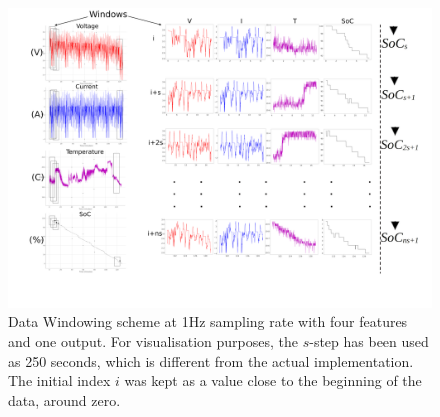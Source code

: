 %
%
\begin{landscape}
    \begin{figure}[ht]
        \centering
        \includegraphics[width=0.9\linewidth]{II_Body/images/Windowing4f-A3.jpg}
        \caption{Data Windowing scheme at 1Hz sampling rate with four features and one output. For visualisation purposes, the $s$-step has been used as 250 seconds, which is different from the actual implementation. The initial index $i$ was kept as a value close to the beginning of the data, around zero.}
        \label{fig:Windowing}
    \end{figure}
\end{landscape}